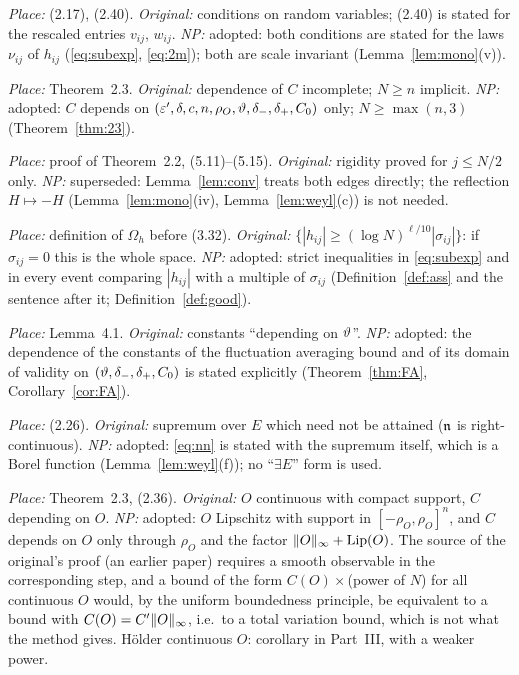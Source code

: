 \begin{description}[leftmargin=1.5em,itemsep=3pt,font=\normalfont\bfseries]
\item[PD-15] \emph{Place:} (2.17), (2.40). \emph{Original:} conditions on random variables; (2.40) is stated for the rescaled entries $v_{ij}$, $w_{ij}$. \emph{NP:} adopted: both conditions are stated for the laws $\nu_{ij}$ of $h_{ij}$ (\eqref{eq:subexp}, \eqref{eq:2m}); both are scale invariant (Lemma~\ref{lem:mono}(v)).
\item[PD-16] \emph{Place:} Theorem~2.3. \emph{Original:} dependence of $C$ incomplete; $N\ge n$ implicit. \emph{NP:} adopted: $C$ depends on $(\varepsilon',\delta,c,n,\rho_O,\vartheta,\delta_-,\delta_+,C_0)$ only; $N\ge\max(n,3)$ (Theorem~\ref{thm:23}).
\item[PD-17] \emph{Place:} proof of Theorem~2.2, (5.11)--(5.15). \emph{Original:} rigidity proved for $j\le N/2$ only. \emph{NP:} superseded: Lemma~\ref{lem:conv} treats both edges directly; the reflection $H\mapsto-H$ (Lemma~\ref{lem:mono}(iv), Lemma~\ref{lem:weyl}(c)) is not needed.
\item[PD-18] \emph{Place:} definition of $\Omega_h$ before (3.32). \emph{Original:} $\{|h_{ij}|\ge(\log N)^{\ell/10}|\sigma_{ij}|\}$: if $\sigma_{ij}=0$ this is the whole space. \emph{NP:} adopted: strict inequalities in \eqref{eq:subexp} and in every event comparing $|h_{ij}|$ with a multiple of $\sigma_{ij}$ (Definition~\ref{def:ass} and the sentence after it; Definition~\ref{def:good}).
\item[PD-19] \emph{Place:} Lemma~4.1. \emph{Original:} constants ``depending on $\vartheta$''. \emph{NP:} adopted: the dependence of the constants of the fluctuation averaging bound and of its domain of validity on $(\vartheta,\delta_-,\delta_+,C_0)$ is stated explicitly (Theorem~\ref{thm:FA}, Corollary~\ref{cor:FA}).
\item[PD-20] \emph{Place:} (2.26). \emph{Original:} supremum over $E$ which need not be attained ($\mathfrak{n}$ is right-continuous). \emph{NP:} adopted: \eqref{eq:nn} is stated with the supremum itself, which is a Borel function (Lemma~\ref{lem:weyl}(f)); no ``$\exists E$'' form is used.
\item[PD-21] \emph{Place:} Theorem~2.3, (2.36). \emph{Original:} $O$ continuous with compact support, $C$ depending on $O$. \emph{NP:} adopted: $O$ Lipschitz with support in $[-\rho_O,\rho_O]^n$, and $C$ depends on $O$ only through $\rho_O$ and the factor $\|O\|_\infty+\operatorname{Lip}(O)$. The source of the original's proof (an earlier paper) requires a smooth observable in the corresponding step,
and a bound of the form $C(O)\times$(power of $N$) for all continuous $O$ would, by the uniform boundedness principle, be equivalent to a bound with $C(O)=C'\|O\|_\infty$, i.e.\ to a total variation bound, which is not what the method gives. H\"older continuous $O$: corollary in Part~III, with a weaker power.
\end{description}


